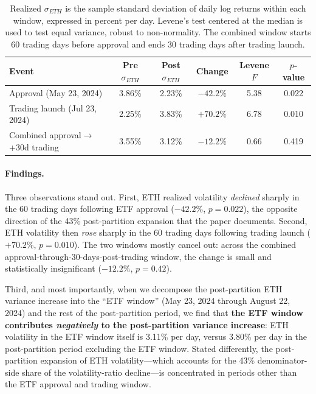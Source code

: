\documentclass[11pt,a4paper]{article}
\begin{document}
\begin{table}[H]
\centering
\caption{ETH realized volatility around spot ETH ETF events ($W=60$ trading days)}
\label{tab:eth_etf}
\begin{tabular}{lccccc}
\toprule
\textbf{Event} & \textbf{Pre $\sigma_{ETH}$} & \textbf{Post $\sigma_{ETH}$} & \textbf{Change} & \textbf{Levene $F$} & \textbf{$p$-value} \\
\midrule
Approval (May 23, 2024) & 3.86\% & 2.23\% & $-42.2\%$ & 5.38 & 0.022 \\
Trading launch (Jul 23, 2024) & 2.25\% & 3.83\% & $+70.2\%$ & 6.78 & 0.010 \\
Combined approval$\to$+30d trading & 3.55\% & 3.12\% & $-12.2\%$ & 0.66 & 0.419 \\
\bottomrule
\end{tabular}
\caption*{\footnotesize Realized $\sigma_{ETH}$ is the sample standard deviation of daily log returns within each window, expressed in percent per day. Levene's test centered at the median is used to test equal variance, robust to non-normality. The combined window starts 60 trading days before approval and ends 30 trading days after trading launch.}
\end{table}

\paragraph{Findings.} Three observations stand out. First, ETH realized volatility \emph{declined} sharply in the 60 trading days following ETF approval ($-42.2\%$, $p=0.022$), the opposite direction of the 43\% post-partition expansion that the paper documents. Second, ETH volatility then \emph{rose} sharply in the 60 trading days following trading launch ($+70.2\%$, $p=0.010$). The two windows mostly cancel out: across the combined approval-through-30-days-post-trading window, the change is small and statistically insignificant ($-12.2\%$, $p=0.42$).

Third, and most importantly, when we decompose the post-partition ETH variance increase into the ``ETF window'' (May 23, 2024 through August 22, 2024) and the rest of the post-partition period, we find that \textbf{the ETF window contributes \emph{negatively} to the post-partition variance increase}: ETH volatility in the ETF window itself is 3.11\% per day, versus 3.80\% per day in the post-partition period excluding the ETF window. Stated differently, the post-partition expansion of ETH volatility---which accounts for the 43\% denominator-side share of the volatility-ratio decline---is concentrated in periods other than the ETF approval and trading window.
\end{document}
